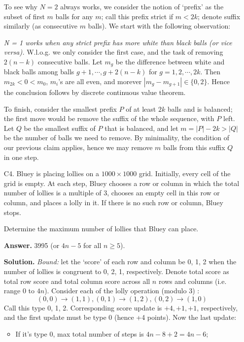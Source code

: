\documentclass[11pt,a4paper]{article}
\begin{document}
\begin{enumerate}
    	To see why $N = 2$ always works, we consider the notion of `prefix' as the subset of first $m$ balls for any $m$; call this prefix strict if $m < 2k$; denote suffix similarly (as consecutive $m$ balls). 
    	We start with the following observation:
    	
    	\textit{N = 1 works when any strict prefix has more white than black balls (or vice versa).} W.l.o.g. we only consider the first case, and the task of removing $2(n-k)$ consecutive balls. 
    	Let $m_g$ be the difference between white and black balls among balls $g+1, \cdots, g+ 2(n-k)$ for $g=1, 2, \cdots, 2k$. 
    	Then $m_{2k} < 0 < m_0$, $m_i$'s are all even, and morever $|m_g-m_{g+1}|\in \{0, 2\}$. 
    	Hence the conclusion follows by discrete continuous value theorem. 
    	
    	To finish, consider the smallest prefix $P$ of at least $2k$ balls and is balanced; the first move would be remove the suffix of the whole sequence, with $P$ left. 
    	Let $Q$ be the smallest suffix of $P$ that is balanced, and let $m=|P|-2k > |Q|$ be the number of balls we need to remove. By minimality, the condition of our previous claim applies, 
    	hence we may remove $m$ balls from this suffix $Q$ in one step. 
    	
    	\item [C4.]
    	Bluey is placing lollies on a $1000\times1000$ grid. Initially, every cell of the grid is empty. At each step, Bluey chooses a row or column in which the total number of lollies is a multiple of $3$, chooses an empty cell in this row or column, and places a lolly in it. If there is no such row or column, Bluey stops.
    	
    	Determine the maximum number of lollies that Bluey can place.
    	
    	\textbf{Answer.} 3995 (or $4n-5$ for all $n\ge 5$). 
    	
    	\textbf{Solution.}
    	\textit{Bound:} let the `score' of each row and column be 0, 1, 2 when the number of lollies is congruent to 0, 2, 1, respectively. 
    	Denote total score as total row score and total column score across all $n$ rows and columns 
    	(i.e. range 0 to $4n$). Consider each of the lolly operation (modulo 3) : 
    	\[
    	(0, 0)\to (1, 1), (0, 1) \to (1, 2), (0, 2) \to (1, 0)
    	\]
    	Call this type 0, 1, 2. 
    	Corresponding score update is $+4, +1, +1$, respectively, 
    	and the first update must be type 0 (hence +4 points). 
    	Now the last update: 
    	\begin{itemize}
    		\item If it's type 0, max total number of steps is $4n-8+2=4n-6$; 
    		

\end{itemize}
\end{enumerate}
\end{document}
